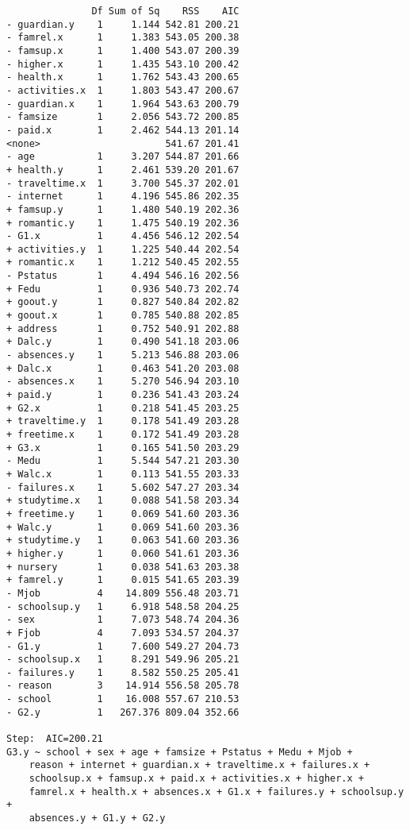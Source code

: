 \documentclass[11pt]{article}
\begin{document}
\begin{enumerate}
\begin{verbatim}
               Df Sum of Sq    RSS    AIC
- guardian.y    1     1.144 542.81 200.21
- famrel.x      1     1.383 543.05 200.38
- famsup.x      1     1.400 543.07 200.39
- higher.x      1     1.435 543.10 200.42
- health.x      1     1.762 543.43 200.65
- activities.x  1     1.803 543.47 200.67
- guardian.x    1     1.964 543.63 200.79
- famsize       1     2.056 543.72 200.85
- paid.x        1     2.462 544.13 201.14
<none>                      541.67 201.41
- age           1     3.207 544.87 201.66
+ health.y      1     2.461 539.20 201.67
- traveltime.x  1     3.700 545.37 202.01
- internet      1     4.196 545.86 202.35
+ famsup.y      1     1.480 540.19 202.36
+ romantic.y    1     1.475 540.19 202.36
- G1.x          1     4.456 546.12 202.54
+ activities.y  1     1.225 540.44 202.54
+ romantic.x    1     1.212 540.45 202.55
- Pstatus       1     4.494 546.16 202.56
+ Fedu          1     0.936 540.73 202.74
+ goout.y       1     0.827 540.84 202.82
+ goout.x       1     0.785 540.88 202.85
+ address       1     0.752 540.91 202.88
+ Dalc.y        1     0.490 541.18 203.06
- absences.y    1     5.213 546.88 203.06
+ Dalc.x        1     0.463 541.20 203.08
- absences.x    1     5.270 546.94 203.10
+ paid.y        1     0.236 541.43 203.24
+ G2.x          1     0.218 541.45 203.25
+ traveltime.y  1     0.178 541.49 203.28
+ freetime.x    1     0.172 541.49 203.28
+ G3.x          1     0.165 541.50 203.29
- Medu          1     5.544 547.21 203.30
+ Walc.x        1     0.113 541.55 203.33
- failures.x    1     5.602 547.27 203.34
+ studytime.x   1     0.088 541.58 203.34
+ freetime.y    1     0.069 541.60 203.36
+ Walc.y        1     0.069 541.60 203.36
+ studytime.y   1     0.063 541.60 203.36
+ higher.y      1     0.060 541.61 203.36
+ nursery       1     0.038 541.63 203.38
+ famrel.y      1     0.015 541.65 203.39
- Mjob          4    14.809 556.48 203.71
- schoolsup.y   1     6.918 548.58 204.25
- sex           1     7.073 548.74 204.36
+ Fjob          4     7.093 534.57 204.37
- G1.y          1     7.600 549.27 204.73
- schoolsup.x   1     8.291 549.96 205.21
- failures.y    1     8.582 550.25 205.41
- reason        3    14.914 556.58 205.78
- school        1    16.008 557.67 210.53
- G2.y          1   267.376 809.04 352.66

Step:  AIC=200.21
G3.y ~ school + sex + age + famsize + Pstatus + Medu + Mjob + 
    reason + internet + guardian.x + traveltime.x + failures.x + 
    schoolsup.x + famsup.x + paid.x + activities.x + higher.x + 
    famrel.x + health.x + absences.x + G1.x + failures.y + schoolsup.y + 
    absences.y + G1.y + G2.y


\end{verbatim}
\end{enumerate}
\end{document}
